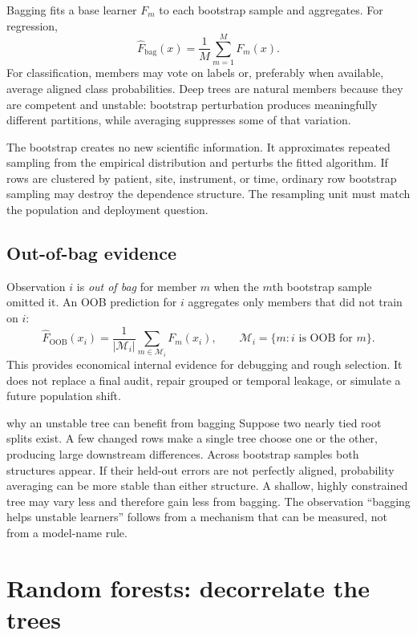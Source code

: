 Bagging fits a base learner $F_m$ to each bootstrap sample and aggregates.
For regression,
\[
  \widehat F_{\mathrm{bag}}(x)=\frac1M\sum_{m=1}^{M}F_m(x).
\]
For classification, members may vote on labels or, preferably when available,
average aligned class probabilities. Deep trees are natural members because
they are competent and unstable: bootstrap perturbation produces meaningfully
different partitions, while averaging suppresses some of that variation.

The bootstrap creates no new scientific information. It approximates repeated
sampling from the empirical distribution and perturbs the fitted algorithm.
If rows are clustered by patient, site, instrument, or time, ordinary row
bootstrap sampling may destroy the dependence structure. The resampling unit
must match the population and deployment question.

\subsection{Out-of-bag evidence}

Observation $i$ is \emph{out of bag} for member $m$ when the $m$th bootstrap
sample omitted it. An OOB prediction for $i$ aggregates only members that did
not train on $i$:
\[
  \widehat F_{\mathrm{OOB}}(x_i)
  =\frac{1}{|\mathcal M_i|}\sum_{m\in\mathcal M_i}F_m(x_i),
  \qquad
  \mathcal M_i=\{m:i\text{ is OOB for }m\}.
\]
This provides economical internal evidence for debugging and rough selection.
It does not replace a final audit, repair grouped or temporal leakage, or
simulate a future population shift.

\begin{workedexample}{why an unstable tree can benefit from bagging}
Suppose two nearly tied root splits exist. A few changed rows make a single
tree choose one or the other, producing large downstream differences. Across
bootstrap samples both structures appear. If their held-out errors are not
perfectly aligned, probability averaging can be more stable than either
structure. A shallow, highly constrained tree may vary less and therefore gain
less from bagging. The observation ``bagging helps unstable learners'' follows
from a mechanism that can be measured, not from a model-name rule.
\end{workedexample}

\section{Random forests: decorrelate the trees}

